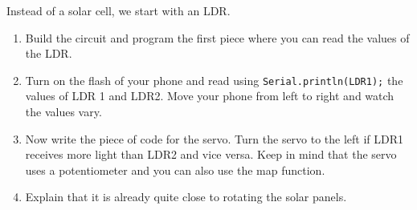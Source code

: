 \documentclass{arduino}
\begin{document}
\newpage

Instead of a solar cell, we start with an LDR.

\begin{enumerate}[label={\alph*})]
\item Build the circuit and program the first piece where you can read the values ​​of the LDR.

\item Turn on the flash of your phone and read using \lstinline{Serial.println(LDR1);} the values ​​of LDR 1 and LDR2. Move your phone from left to right and watch the values ​​vary.

\item Now write the piece of code for the servo. Turn the servo to the left if LDR1 receives more light than LDR2 and vice versa. Keep in mind that the servo uses a potentiometer and you can also use the map function.

\item Explain that it is already quite close to rotating the solar panels.
\end{enumerate}
\end{document}
